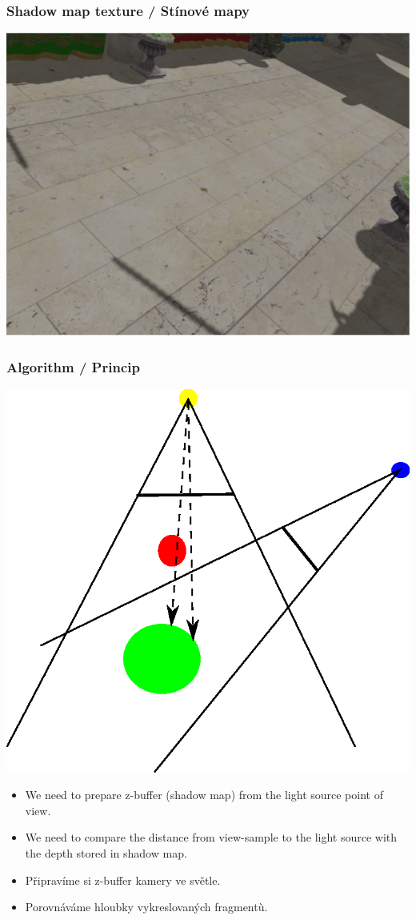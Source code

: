 \begin{frame}\frametitle{Shadow map texture / Stínové mapy}
  \includegraphics[width=\textwidth]{pics/shadows/shadowMapping/pcf_nearest.eps}
\end{frame}

\begin{frame}\frametitle{Algorithm / Princip}\scriptsize
  \includegraphics[height=.5\textheight]{pics/shadows/shadowMapping/smap.eps}
  \begin{itemize}
    \item We need to prepare z-buffer (shadow map) from the light source point of view.
    \item We need to compare the distance from view-sample to the light source with the depth stored in shadow map.
  \end{itemize}
  \begin{itemize}
    \item Připravíme si z-buffer kamery ve světle.
    \item Porovnáváme hloubky vykreslovaných fragmentù.
  \end{itemize}
\end{frame}

